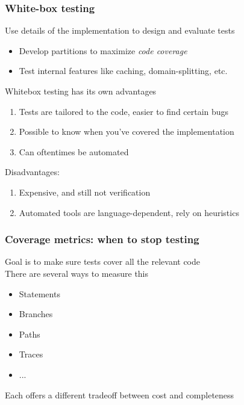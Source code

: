 \documentclass[10pt,xcolor={dvipsnames}]{beamer}
\begin{document}
\begin{frame}

\frametitle{White-box testing}

Use details of the implementation to design and evaluate tests
\begin{itemize}
\item Develop partitions to maximize \emph{code coverage} \\[0.5em]
\item Test internal features like caching, domain-splitting, etc. \\[1.5em]
\end{itemize}

\pause
Whitebox testing has its own advantages
\begin{enumerate}
\pause\item Tests are tailored to the code, easier to find certain bugs \\[0.5em]
\pause\item Possible to know when you've covered the implementation \\[0.5em]
\pause\item Can oftentimes be automated \\[1.5em]
\end{enumerate}

\pause
Disadvantages:
\begin{enumerate}
\pause\item Expensive, and still not verification \\[0.5em]
\pause\item Automated tools are language-dependent, rely on heuristics
\end{enumerate}

\end{frame}


\begin{frame}

\frametitle{Coverage metrics: when to stop testing}

Goal is to make sure tests cover all the relevant code
\\[1em]

\pause
There are several ways to measure this
\begin{itemize}
\pause\item Statements
\item Branches
\item Paths
\item Traces
\item ... \\[1.5em]
\end{itemize}

\pause
Each offers a different tradeoff between cost and completeness

\end{frame}
\end{document}
